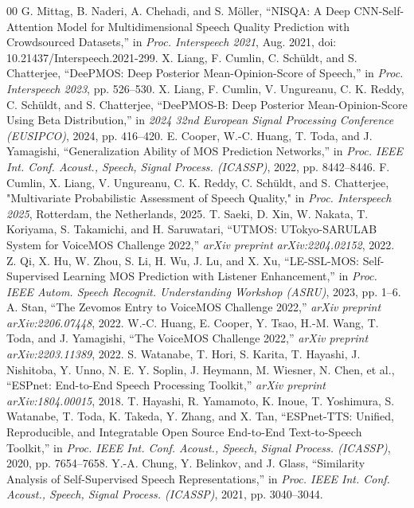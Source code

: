 \documentclass[conference]{IEEEtran}
\begin{document}
\begin{thebibliography}{00}
 G. Mittag, B. Naderi, A. Chehadi, and S. Möller, ``NISQA: A Deep CNN-Self-Attention Model for Multidimensional Speech Quality Prediction with Crowdsourced Datasets,'' in \textit{Proc. Interspeech 2021}, Aug. 2021, doi: 10.21437/Interspeech.2021-299.
 X. Liang, F. Cumlin, C. Sch\"uldt, and S. Chatterjee, ``DeePMOS: Deep Posterior Mean-Opinion-Score of Speech,'' in \textit{Proc. Interspeech 2023}, pp. 526--530.
 X. Liang, F. Cumlin, V. Ungureanu, C. K. Reddy, C. Sch\"uldt, and S. Chatterjee, “DeePMOS-B: Deep Posterior Mean-Opinion-Score Using Beta Distribution,” in \textit{2024 32nd European Signal Processing Conference (EUSIPCO)}, 2024, pp. 416--420.
 E. Cooper, W.-C. Huang, T. Toda, and J. Yamagishi, ``Generalization Ability of MOS Prediction Networks,'' in \textit{Proc. IEEE Int. Conf. Acoust., Speech, Signal Process. (ICASSP)}, 2022, pp. 8442--8446.
 F. Cumlin, X. Liang, V. Ungureanu, C. K. Reddy, C. Schüldt, and S. Chatterjee, "Multivariate Probabilistic Assessment of Speech Quality," in \textit{Proc. Interspeech 2025}, Rotterdam, the Netherlands, 2025.
 T. Saeki, D. Xin, W. Nakata, T. Koriyama, S. Takamichi, and H. Saruwatari, ``UTMOS: UTokyo-SARULAB System for VoiceMOS Challenge 2022,'' \textit{arXiv preprint arXiv:2204.02152}, 2022.
 Z. Qi, X. Hu, W. Zhou, S. Li, H. Wu, J. Lu, and X. Xu, ``LE-SSL-MOS: Self-Supervised Learning MOS Prediction with Listener Enhancement,'' in \textit{Proc. IEEE Autom. Speech Recognit. Understanding Workshop (ASRU)}, 2023, pp. 1--6.
 A. Stan, ``The Zevomos Entry to VoiceMOS Challenge 2022,'' \textit{arXiv preprint arXiv:2206.07448}, 2022.
 W.-C. Huang, E. Cooper, Y. Tsao, H.-M. Wang, T. Toda, and J. Yamagishi, ``The VoiceMOS Challenge 2022,'' \textit{arXiv preprint arXiv:2203.11389}, 2022.
 S. Watanabe, T. Hori, S. Karita, T. Hayashi, J. Nishitoba, Y. Unno, N. E. Y. Soplin, J. Heymann, M. Wiesner, N. Chen, et al., ``ESPnet: End-to-End Speech Processing Toolkit,'' \textit{arXiv preprint arXiv:1804.00015}, 2018.
 T. Hayashi, R. Yamamoto, K. Inoue, T. Yoshimura, S. Watanabe, T. Toda, K. Takeda, Y. Zhang, and X. Tan, ``ESPnet-TTS: Unified, Reproducible, and Integratable Open Source End-to-End Text-to-Speech Toolkit,'' in \textit{Proc. IEEE Int. Conf. Acoust., Speech, Signal Process. (ICASSP)}, 2020, pp. 7654--7658.
 Y.-A. Chung, Y. Belinkov, and J. Glass, ``Similarity Analysis of Self-Supervised Speech Representations,'' in \textit{Proc. IEEE Int. Conf. Acoust., Speech, Signal Process. (ICASSP)}, 2021, pp. 3040--3044.

\end{thebibliography}
\end{document}
